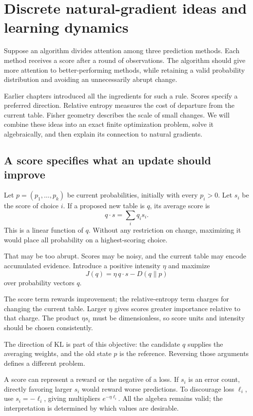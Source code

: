 \documentclass[11pt,oneside,openany]{book}
\theoremstyle{definition}
\theoremstyle{remark}
\numberwithin{equation}{chapter}
\begin{document}
\FloatBarrier

\chapter{Discrete natural-gradient ideas and learning dynamics}
Suppose an algorithm divides attention among three prediction methods. Each method receives a score after a round of observations. The algorithm should give more attention to better-performing methods, while retaining a valid probability distribution and avoiding an unnecessarily abrupt change.

Earlier chapters introduced all the ingredients for such a rule. Scores specify a preferred direction. Relative entropy measures the cost of departure from the current table. Fisher geometry describes the scale of small changes. We will combine these ideas into an exact finite optimization problem, solve it algebraically, and then explain its connection to natural gradients.

\section{A score specifies what an update should improve}\label{ch09-a-score-specifies-what-an-update-should-improve}

Let \(p=(p_1,\ldots,p_k)\) be current probabilities, initially with every \(p_i>0\). Let \(s_i\) be the score of choice \(i\). If a proposed new table is \(q\), its average score is \[q\cdot s=\sum_i q_i s_i.\] This is a linear function of \(q\). Without any restriction on change, maximizing it would place all probability on a highest-scoring choice.

That may be too abrupt. Scores may be noisy, and the current table may encode accumulated evidence. Introduce a positive intensity \(\eta\) and maximize \[\boxed{J(q)=\eta\,q\cdot s-D(q\|p)}\] over probability vectors \(q\).

The score term rewards improvement; the relative-entropy term charges for changing the current table. Larger \(\eta\) gives scores greater importance relative to that charge. The product \(\eta s_i\) must be dimensionless, so score units and intensity should be chosen consistently.

The direction of KL is part of this objective: the candidate \(q\) supplies the averaging weights, and the old state \(p\) is the reference. Reversing those arguments defines a different problem.

A score can represent a reward or the negative of a loss. If \(s_i\) is an error count, directly favoring larger \(s_i\) would reward worse predictions. To discourage loss \(\ell_i\), use \(s_i=-\ell_i\), giving multipliers \(e^{-\eta\ell_i}\). All the algebra remains valid; the interpretation is determined by which values are desirable.
\end{document}
